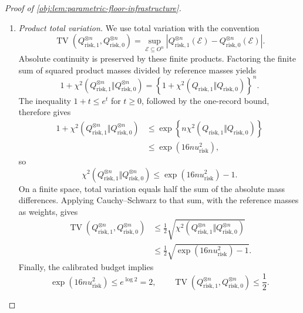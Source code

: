 \begin{proof}[Proof of \cref{obj:lem:parametric-floor-infrastructure}]
\begin{enumerate}
\item \emph{Product total variation.}
We use total variation with the convention
\[
\operatorname{TV}
 (Q_{\mathrm{risk},1}^{\otimes n},Q_{\mathrm{risk},0}^{\otimes n})
=
\sup_{\mathcal E\subseteq O^n}
\left|
Q_{\mathrm{risk},1}^{\otimes n}(\mathcal E)
-
Q_{\mathrm{risk},0}^{\otimes n}(\mathcal E)
\right|.
\]
Absolute continuity is preserved by these finite products. Factoring the finite sum of squared product masses divided by reference masses yields
\[
1+\chi^2
 (Q_{\mathrm{risk},1}^{\otimes n}\Vert Q_{\mathrm{risk},0}^{\otimes n})
=
\left\{
1+\chi^2(Q_{\mathrm{risk},1}\Vert Q_{\mathrm{risk},0})
\right\}^{n}.
\]
The inequality \(1+t\le e^t\) for \(t\ge0\), followed by the one-record bound, therefore gives
\[
\begin{aligned}
1+\chi^2
 (Q_{\mathrm{risk},1}^{\otimes n}\Vert Q_{\mathrm{risk},0}^{\otimes n})
&\le
\exp\!\left\{
n\chi^2(Q_{\mathrm{risk},1}\Vert Q_{\mathrm{risk},0})
\right\}\\
&\le \exp(16n u_{\mathrm{risk}}^2),
\end{aligned}
\]
so
\[
\chi^2
 (Q_{\mathrm{risk},1}^{\otimes n}\Vert Q_{\mathrm{risk},0}^{\otimes n})
\le \exp(16n u_{\mathrm{risk}}^2)-1.
\]
On a finite space, total variation equals half the sum of the absolute mass differences. Applying Cauchy--Schwarz to that sum, with the reference masses as weights, gives
\[
\begin{aligned}
\operatorname{TV}
 (Q_{\mathrm{risk},1}^{\otimes n},Q_{\mathrm{risk},0}^{\otimes n})
&\le
\frac12\sqrt{
\chi^2
 (Q_{\mathrm{risk},1}^{\otimes n}\Vert Q_{\mathrm{risk},0}^{\otimes n})
}\\
&\le
\frac12\sqrt{\exp(16n u_{\mathrm{risk}}^2)-1}.
\end{aligned}
\]
Finally, the calibrated budget implies
\[
\exp(16n u_{\mathrm{risk}}^2)\le e^{\log 2}=2,
\qquad
\operatorname{TV}
 (Q_{\mathrm{risk},1}^{\otimes n},Q_{\mathrm{risk},0}^{\otimes n})
\le\frac12.
\]


\end{enumerate}
\end{proof}

